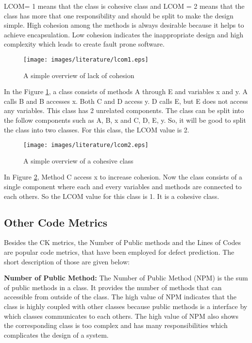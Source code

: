 \documentclass[12pt]{report}
\begin{document}
LCOM= 1 means that the class is cohesive class and LCOM \gt= 2 means that the class has more that one responsibility and should be split to make the design simple. High cohesion among the methods is always desirable because it helps to achieve encapsulation. Low cohesion indicates the inappropriate design and high complexity which leads to create fault prone software.   

\begin{figure}[h!]
  \centering
    \texttt{[image: images/literature/lcom1.eps]}
		\caption{A simple overview of lack of cohesion}
		\label{lcom1}
\end{figure}


In the Figure \ref{lcom1}, a class consists of methods A through E and variables x and y. A calls B and B accesses x. Both C and D access y. D calls E, but E does not access any variables. This class has 2 unrelated components. The class can be split into the follow components such as {A, B, x} and {C, D, E, y}. So, it will be good to split the class into two classes. For this class, the LCOM value is 2. 
\begin{figure}[h!]
  \centering
    \texttt{[image: images/literature/lcom2.eps]}
		\caption{A simple overview of a cohesive class}
		\label{lcom2}
\end{figure}

In Figure \ref{lcom2}, Method C access x to increase cohesion. Now the class consists of a single component where each and every variables and methods are connected to each others. So the LCOM value for this class is 1. It is a cohesive class. 

\subsection{ Other Code Metrics}
Besides the CK metrics, the Number of Public methods and the Lines of Codes are popular code metrics, that have been employed for defect prediction. The short description of those are given below:

\textbf{Number of Public Method:}
The Number of Public Method (NPM) is the sum of public methods in a class. It provides the number of methods that can accessible from outside of the class. The high value of NPM indicates that the class is highly coupled with other classes because public methods is a interface by which classes communicates to each others. The high value of NPM also shows the corresponding class is too complex and has many responsibilities which complicates the design of a system.
\end{document}
